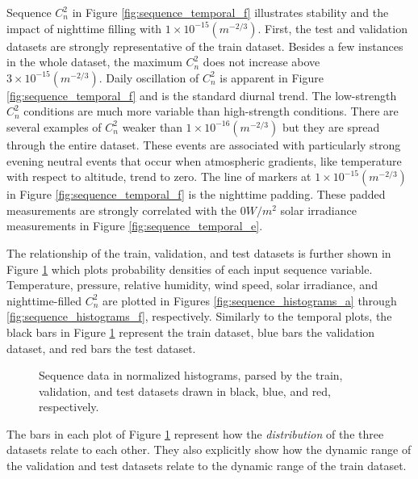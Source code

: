 Sequence $C_{n}^{2}$ in Figure \ref{fig:sequence_temporal_f} illustrates stability and the impact of nighttime filling with $1 \times 10^{-15} (m^{-2/3})$. First, the test and validation datasets are strongly representative of the train dataset. Besides a few instances in the whole dataset, the maximum $C_{n}^{2}$ does not increase above $3 \times 10^{-15} (m^{-2/3})$. Daily oscillation of $C_{n}^{2}$ is apparent in Figure \ref{fig:sequence_temporal_f} and is the standard diurnal trend. The low-strength $C_{n}^{2}$ conditions are much more variable than high-strength conditions. There are several examples of $C_{n}^{2}$ weaker than $1 \times 10^{-16} (m^{-2/3})$ but they are spread through the entire dataset. These events are associated with particularly strong evening neutral events that occur when atmospheric gradients, like temperature with respect to altitude, trend to zero. The line of markers at $1 \times 10^{-15} (m^{-2/3})$ in Figure \ref{fig:sequence_temporal_f} is the nighttime padding. These padded measurements are strongly correlated with the $0 W/m^{2}$ solar irradiance measurements in Figure \ref{fig:sequence_temporal_e}.

The relationship of the train, validation, and test datasets is further shown in Figure \ref{fig:sequence_histograms} which plots probability densities of each input sequence variable. Temperature, pressure, relative humidity, wind speed, solar irradiance, and nighttime-filled $C_{n}^{2}$ are plotted in Figures \ref{fig:sequence_histograms_a} through \ref{fig:sequence_histograms_f}, respectively. Similarly to the temporal plots, the black bars in Figure \ref{fig:sequence_histograms} represent the train dataset, blue bars the validation dataset, and red bars the test dataset.
\begin{figure}[p!]
	\centering
	\hfill
	\hfill
	\hfill
	\caption{Sequence data in normalized histograms, parsed by the train, validation, and test datasets drawn in black, blue, and red, respectively.}
	\label{fig:sequence_histograms}
\end{figure}
The bars in each plot of Figure \ref{fig:sequence_histograms} represent how the \emph{distribution} of the three datasets relate to each other. They also explicitly show how the dynamic range of the validation and test datasets relate to the dynamic range of the train dataset.

